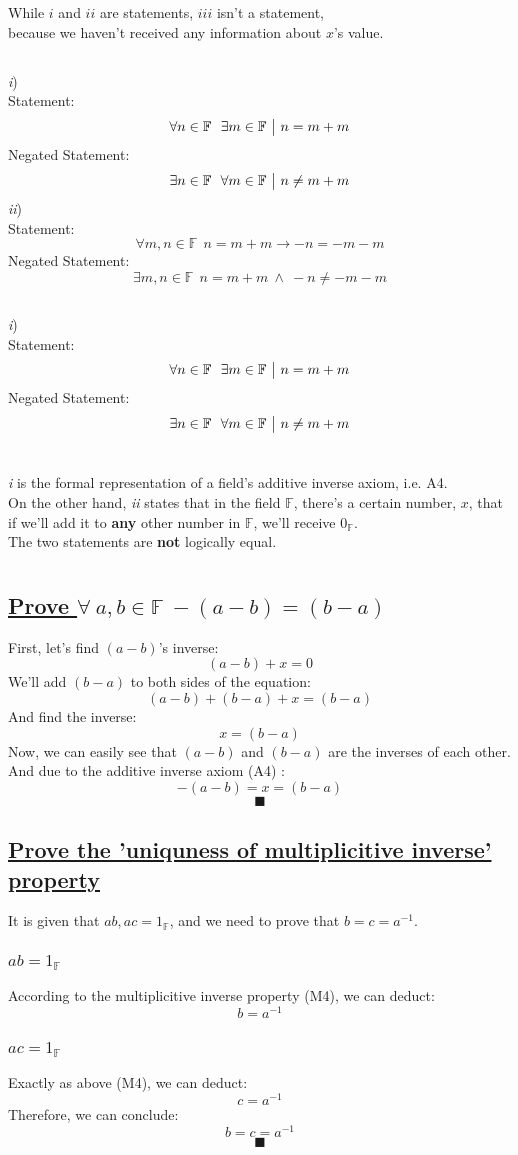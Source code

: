 \documentclass[a4paper, 12pt]{article}
\newcommand{\sub}[1]{\subsection{\underline{#1}}}
\newcommand{\subsub}[1]{\subsubsection{\underline{#1}}}
\newcommand{\?}{\stackrel{?}{=}}
\newcommand{\F}{\ensuremath{\mathbb{F}}}
\renewcommand{\qed}{$$\blacksquare$$}
\renewcommand{\b}[1]{\textbf{#1}}
\begin{document}
\begin{titlepage}
\end{titlepage}

\section{}
\sub{}
While $i$ and $ii$ are statements, $iii$ isn't a statement,\\
because we haven't received any information about $x$'s value.
\sub{}
    \textit{i})\\
        Statement: $$ \forall{n}\in{\F} ~~ \exists{m}\in{\F} ~\big{|}~ n=m+m $$
        Negated Statement: $$ \exists{n}\in{\F} ~~ \forall{m}\in{\F} ~\big{|}~ n\neq m+m $$
    \textit{ii})\\
        Statement: $$ \forall{m,n}\in{\F} ~~ n=m+m \rightarrow -n=-m-m $$
        Negated Statement: $$ \exists{m,n}\in{\F} ~~ n=m+m ~\land~ -n\neq-m-m $$
\sub{}
    \textit{i})\\
        Statement: $$ \forall{n}\in{\F} ~~ \exists{m}\in{\F} ~\big{|}~ n=m+m $$
        Negated Statement: $$ \exists{n}\in{\F} ~~ \forall{m}\in{\F} ~\big{|}~ n\neq m+m $$

\section{}
\textit{i} is the formal representation of a field's additive inverse axiom, i.e. A4.\\
On the other hand, \textit{ii} states that in the field \F, there's a certain number, $x$,
that if we'll add it to \b{any} other number in \F, we'll receive $0_{\F}$.\\
The two statements are \b{not} logically equal.
\pagebreak

\section{}
\sub{Prove $\forall~a,b \in{\F}~ -(a-b)=(b-a)$}
First, let's find $(a-b)$'s inverse: $$ (a-b)+x=0 $$
We'll add $(b-a)$ to both sides of the equation: $$ (a-b)+(b-a)+x=(b-a) $$
And find the inverse: $$ x = (b-a) $$
Now, we can easily see that $(a-b)$ and $(b-a)$ are the inverses of each other.\\
And due to the additive inverse axiom (A4) : $$ -(a-b) = x = (b-a) $$
\qed

\sub{Prove the 'uniquness of multiplicitive inverse' property}
It is given that $ab, ac=1_{\F}$, and we need to prove that $b=c=a^{-1}$.
\subsub{$ab=1_{\F}$}
According to the multiplicitive inverse property (M4), we can deduct:
$$ b=a^{-1} $$
\subsub{$ac=1_{\F}$}
Exactly as above (M4), we can deduct:
$$ c=a^{-1} $$
Therefore, we can conclude: $$ b=c=a^{-1} $$
\qed
\pagebreak
\end{document}
